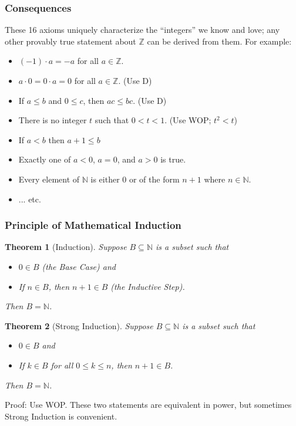 \documentclass{beamer}
\newtheorem{thm}{Theorem}
\begin{document}
\begin{frame}
\frametitle{Consequences}

These 16 axioms uniquely characterize the ``integers'' we know and love; any other provably true statement about $\mathbb{Z}$ can be derived from them. For example: \pause

\begin{itemize}
\item $(-1) \cdot a = -a$ for all $a \in \mathbb{Z}$. \pause
\item $a \cdot 0 = 0 \cdot a = 0$ for all $a \in \mathbb{Z}$. \pause (Use D) \pause
\item If $a \leq b$ and $0 \leq c$, then $ac \leq bc$. \pause (Use D) \pause
\item There is no integer $t$ such that $0 < t < 1$. \pause (Use WOP; $t^2 < t$) \pause
\item If $a < b$ then $a+1 \leq b$ \pause
\item Exactly one of $a < 0$, $a = 0$, and $a > 0$ is true. \pause
\item Every element of $\mathbb{N}$ is either 0 or of the form $n+1$ where $n \in \mathbb{N}$. \pause
\item ... etc.
\end{itemize}
\end{frame}



\begin{frame}
\frametitle{Principle of Mathematical Induction}

\begin{thm}[Induction]
Suppose $B \subseteq \mathbb{N}$ is a subset such that
\begin{itemize}
\item $0 \in B$ (the \emph{Base Case}) and
\item If $n \in B$, then $n + 1 \in B$ (the \emph{Inductive Step}).
\end{itemize}
Then $B = \mathbb{N}$.
\end{thm}

\begin{thm}[Strong Induction]
Suppose $B \subseteq \mathbb{N}$ is a subset such that
\begin{itemize}
\item $0 \in B$ and
\item If $k \in B$ for all $0 \leq k \leq n$, then $n+1 \in B$.
\end{itemize}
Then $B = \mathbb{N}$.
\end{thm}

Proof: Use WOP. These two statements are equivalent in power, but sometimes Strong Induction is convenient.
\end{frame}
\end{document}
